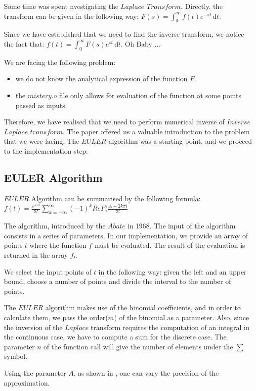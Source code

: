 Some time was spent nvestigating the $Laplace$ $Transform$. Directly, the transform can be given in the following way:
$F(s) =\int_0^\infty \! f(t)e^{-st} \, \mathrm{d}t$.

Since we have established that we need to find the inverse transform, we notice the fact that:
$f(t) =\int_0^\infty \! F(s)e^{st} \, \mathrm{d}t$. Oh Baby ...
\newline

We are facing the following problem:
\begin{itemize}
\item{we do not know the analytical expression of the function $F$. }
\item{the $mistery.o$ file only allows for evaluation of the function at some points passed as inputs. }
\end{itemize}

Therefore, we have realised that we need to perform numerical inverse of $Inverse$ $Laplace$ $transform$.
The paper offered us a valuable introduction to the problem that we were facing.
The $EULER$ algorithm was a starting point, and we proceed to the implementation step:

\subsection{EULER Algorithm}
$EULER$ Algorithm can be summarised by the following formula:
$f(t) = \frac{e^{A/2}}{2t} \sum\limits_{k=-\infty}^\infty {(-1)^k Re F(\frac{A+2k\pi i}{2t} }$

The algorithm, introduced by the $Abate$ in 1968\cite{abate}. 
The input of the algorithm consists in a series of parameters.
In our implementation, we provide an array of points $t$ where the 
function $f$ must be evaluated. The result of the evaluation is returned
in the array $f_t$.

We select the input points of $t$ in the following way: given the left and
an upper bound, choose a number of points and divide the interval 
to the number of points. 

The $EULER$ algorithm makes use of the binomial coefficients, and in order 
to calculate them, we pass the order($m$) of the binomial as a parameter.
Also, since the inversion of the $Laplace$ transform requires the computation
of an integral in the continuous case, we have to compute a sum for the discrete
case. The parameter $n$ of the function call will give the number of elements under the
$\sum$ symbol.

Using the parameter $A$, as shown in \cite{abate}, one can vary the precision of the approximation.



